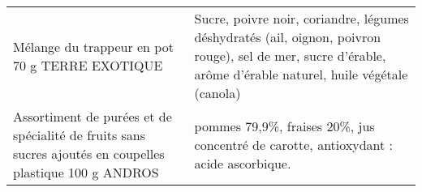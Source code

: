 \begin{longtable}{p{5cm}p{10cm}}
                                                           Mélange du trappeur en pot 70 g TERRE EXOTIQUE &                                                                                                                                                                                                                                                                                                                                                                                                                                                                                                                                                                                                                                                                                                                                                                                                                                                                             Sucre, poivre noir, coriandre, légumes déshydratés (ail, oignon, poivron rouge), sel de mer, sucre d'érable, arôme d'érable naturel, huile végétale (canola) \\
 Assortiment de purées et de spécialité de fruits sans sucres ajoutés en coupelles plastique 100 g ANDROS &                                                                                                                                                                                                                                                                                                                                                                                                                                                                                                                                                                                                                                                                                                                                                                                                                                                                                                                                                     pommes 79,9\%, fraises 20\%, jus concentré de carotte, antioxydant : acide ascorbique. \\

\end{longtable}
